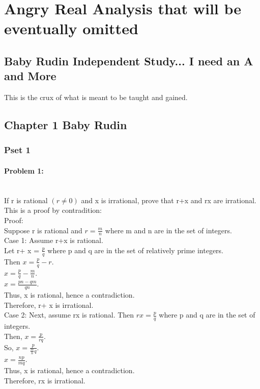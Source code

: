 \chapter{Angry Real Analysis that will be eventually omitted}



\section[Baby Rudin]{Baby Rudin Independent Study... I need an A and More}
This is the crux of what is meant to be taught and gained. 

\section{Chapter 1 Baby Rudin}


\newpage

\subsection{Pset 1}


\subsubsection*{Problem 1:} \\ 
If r is rational $(r \neq 0)$ and x is irrational, prove that r+x and rx are irrational. \\ 




This is a proof by contradition: \\


Proof: 
\\
Suppose r is rational and $r=\frac{m}{n}$ where m and n are in the set of integers.   \\
Case 1: 
Assume r+x is rational. \\ 
Let r+ x = $\frac{p}{q}$ where p and q are in the set of relatively prime integers.\\ 
Then $x= \frac{p}{q}-r.$ \\ 
$x=\frac{p}{q}-\frac{m}{n}.$ \\ 
$x= \frac{pn-qm}{qn}.$ \\ 
Thus, x is rational, hence a contradiction. \\
Therefore, r+ x is irrational.  \\ 

Case 2: 
Next, assume rx is rational. 
Then $rx =\frac{p}{q}$ where p and q are in the set of integers. \\ 
Then, $x=\frac{p}{rq}.$ \\ 
So, $x= \frac{p}{\frac{m}{n}q}.$ \\ 
$x=\frac{np}{mq}.$ \\ 
Thus, x is rational, hence a contradiction. 
\\ Therefore, rx is irrational. \\ 


